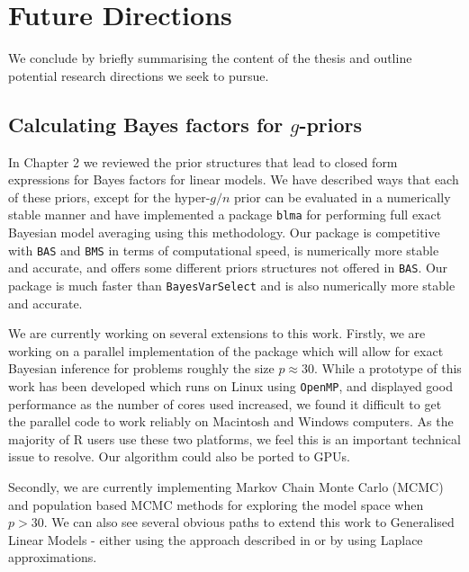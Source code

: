 \chapter{Future Directions}
\label{sec:chapter_2_conclusion}
		

We conclude by briefly summarising the content of the thesis and outline potential research directions we seek to pursue.


\section{Calculating Bayes factors for $g$-priors}

In Chapter 2 we reviewed the prior structures that lead to closed form expressions for
Bayes factors for linear models. We have described ways that each of these
priors, except for the hyper-$g/n$ prior can be evaluated in a numerically stable
manner and have implemented a package \texttt{blma} for performing full exact
Bayesian model averaging using this methodology. Our package is competitive
with \texttt{BAS} and \texttt{BMS} in terms of computational speed, is
numerically more stable and accurate, and offers some different priors
structures not offered in \texttt{BAS}. Our package is much faster than
\texttt{BayesVarSelect} and is also numerically more stable and accurate.

We are currently working on several extensions to this work. Firstly, we are
working on a parallel implementation of the package which will allow for exact
Bayesian inference for problems roughly the size $p\approx 30$. While a
prototype of this work has been developed which runs on Linux using
\texttt{OpenMP}, and displayed good performance as the number of cores used
increased, we found it difficult to get the parallel code to work reliably on
Macintosh and Windows computers.  As the majority of R users use these two
platforms, we feel this is an important technical issue to resolve. Our
algorithm could also be ported to GPUs.

Secondly, we are currently implementing  Markov Chain Monte Carlo (MCMC) and
population based MCMC methods for exploring the model space when $p>30$.  We
can also see several obvious paths to extend this work to Generalised Linear
Models - either using the approach described in \cite{Li2015} or by using
Laplace approximations. 

